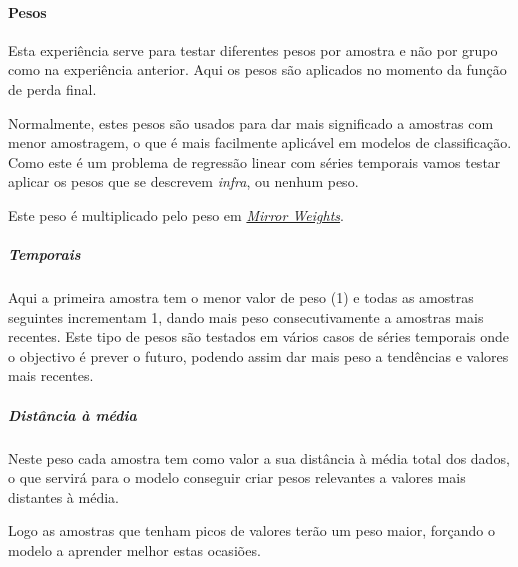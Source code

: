 \paragraph{Pesos}
\text{ }  \par

Esta experiência serve para testar diferentes pesos por amostra e não por grupo como na experiência anterior. Aqui os pesos são aplicados no momento da função de perda final.\par
Normalmente, estes pesos são usados para dar mais significado a amostras com menor amostragem, o que é mais facilmente aplicável em modelos de classificação. Como este é um problema de regressão linear com séries temporais vamos testar aplicar os pesos que se descrevem \textit{infra}, ou nenhum peso.\par
Este peso é multiplicado pelo peso em \hyperref[se:advancedloss]{\textit{Mirror Weights}}.


\subparagraph{Temporais}
\text{ }  \par
Aqui a primeira amostra tem o menor valor de peso (1) e todas as amostras seguintes incrementam 1, dando mais peso consecutivamente a amostras mais recentes. Este tipo de pesos são testados em vários casos de séries temporais onde o objectivo é prever o futuro, podendo assim dar mais peso a tendências e valores mais recentes.\par

\subparagraph{Distância à média}
\text{ }  \par
Neste peso cada amostra tem como valor a sua distância à média total dos dados, o que servirá para o modelo conseguir criar pesos relevantes a valores mais distantes à média.\par
Logo as amostras que tenham picos de valores terão um peso maior, forçando o modelo a aprender melhor estas ocasiões.

